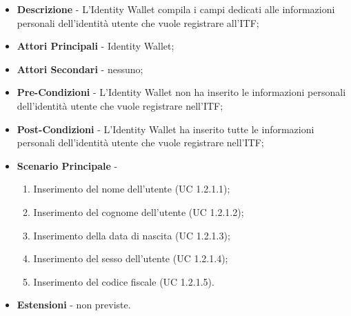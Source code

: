 \begin{itemize}
	\item \textbf{Descrizione} - L'Identity Wallet compila i campi dedicati alle informazioni personali dell'identità utente che vuole registrare all'ITF;
	\item \textbf{Attori Principali} - Identity Wallet;
	\item \textbf{Attori Secondari} - nessuno;
	\item \textbf{Pre-Condizioni} - L'Identity Wallet non ha inserito le informazioni personali dell'identità utente che vuole registrare nell'\gls{ITF};
	\item \textbf{Post-Condizioni} - L'Identity Wallet ha inserito tutte le informazioni personali dell'identità utente che vuole registrare nell'\gls{ITF};
	\item \textbf{Scenario Principale} -
	\begin{enumerate}
		\item Inserimento del nome dell'utente (UC 1.2.1.1);
		\item Inserimento del cognome dell'utente (UC 1.2.1.2);
		\item Inserimento della data di nascita (UC 1.2.1.3);
		\item Inserimento del sesso dell'utente (UC 1.2.1.4);
		\item Inserimento del codice fiscale (UC 1.2.1.5).
	\end{enumerate}
	\item \textbf{Estensioni} - non previste.
\end{itemize}
\newpage
